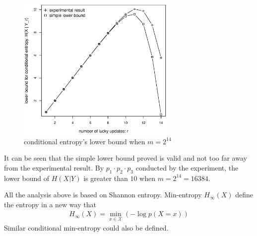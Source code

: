 \documentclass[10pt, conference, compsocconf]{IEEEtran}
\begin{document}
        \begin{figure}[!t]
        \centering
        \includegraphics[width=3in, trim=0mm 0mm 0mm 20mm]{hp14.eps}
        \caption{conditional entropy's lower bound when $m = 2^{14}$}\label{hp14}
        \end{figure}

        It can be seen that the simple lower bound proved is valid and not too
        far away from the experimental result. By $p_1 \cdot p_2 \cdot p_3$
        conducted by the experiment, the lower bound of $H(X|Y)$ is greater than $10$
        when $m = 2^{14} = 16384$.

%
%

    All the analysis above is based on Shannon entropy.
    Min-entropy $H_\infty(X)$ define the entropy in a new way that
    \begin{align*}
        H_\infty(X) = \min_{x \in \mathcal X} \left(-\log p\left(X = x\right) \right)
    \end{align*}
    Similar conditional min-entropy could also be defined.
\end{document}
